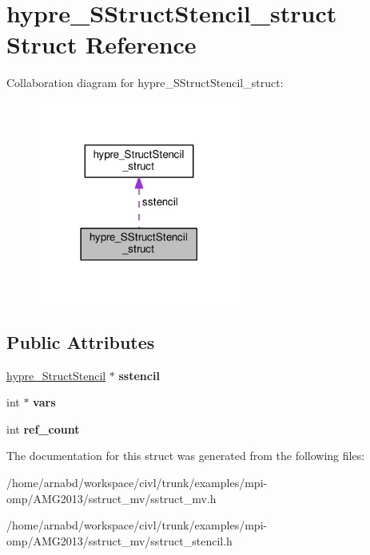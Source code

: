 \hypertarget{structhypre__SStructStencil__struct}{}\section{hypre\+\_\+\+S\+Struct\+Stencil\+\_\+struct Struct Reference}
\label{structhypre__SStructStencil__struct}


Collaboration diagram for hypre\+\_\+\+S\+Struct\+Stencil\+\_\+struct\+:
\nopagebreak
\begin{figure}[H]
\begin{center}
\leavevmode
\includegraphics[width=189pt]{structhypre__SStructStencil__struct__coll__graph}
\end{center}
\end{figure}
\subsection*{Public Attributes}
\begin{DoxyCompactItemize}
\item 
\hypertarget{structhypre__SStructStencil__struct_a1723646b0e3896182938da2db4365b79}{}\hyperlink{structhypre__StructStencil__struct}{hypre\+\_\+\+Struct\+Stencil} $\ast$ {\bfseries sstencil}\label{structhypre__SStructStencil__struct_a1723646b0e3896182938da2db4365b79}

\item 
\hypertarget{structhypre__SStructStencil__struct_a5fca75eead0ab7e3a214b632dc5ba38c}{}int $\ast$ {\bfseries vars}\label{structhypre__SStructStencil__struct_a5fca75eead0ab7e3a214b632dc5ba38c}

\item 
\hypertarget{structhypre__SStructStencil__struct_ad2549d64076e7ea4e1d607804d0097bd}{}int {\bfseries ref\+\_\+count}\label{structhypre__SStructStencil__struct_ad2549d64076e7ea4e1d607804d0097bd}

\end{DoxyCompactItemize}


The documentation for this struct was generated from the following files\+:\begin{DoxyCompactItemize}
\item 
/home/arnabd/workspace/civl/trunk/examples/mpi-\/omp/\+A\+M\+G2013/sstruct\+\_\+mv/sstruct\+\_\+mv.\+h\item 
/home/arnabd/workspace/civl/trunk/examples/mpi-\/omp/\+A\+M\+G2013/sstruct\+\_\+mv/sstruct\+\_\+stencil.\+h\end{DoxyCompactItemize}
